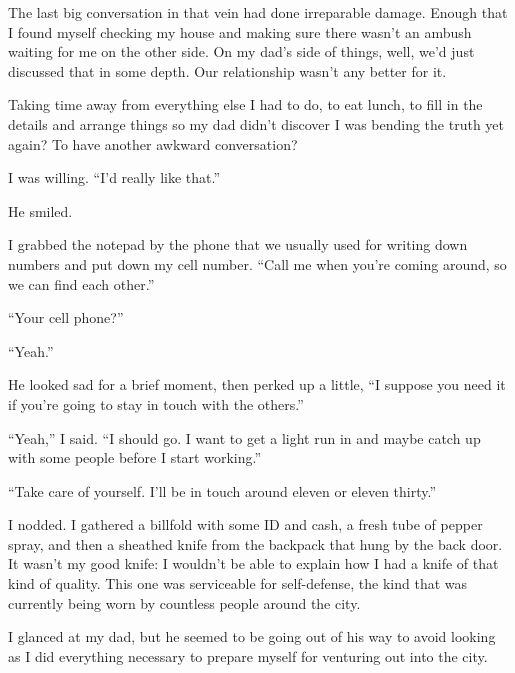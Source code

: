 The last big conversation in that vein had done irreparable damage.  Enough that I found myself checking my house and making sure there wasn't an ambush waiting for me on the other side.  On my dad's side of things, well, we'd just discussed that in some depth.  Our relationship wasn't any better for it.



Taking time away from everything else I had to do, to eat lunch, to fill in the details and arrange things so my dad didn't discover I was bending the truth yet again?  To have another awkward conversation?



I was willing.  ``I'd really like that.''



He smiled.



I grabbed the notepad by the phone that we usually used for writing down numbers and put down my cell number.  ``Call me when you're coming around, so we can find each other.''



``Your cell phone?''



``Yeah.''



He looked sad for a brief moment, then perked up a little, ``I suppose you need it if you're going to stay in touch with the others.''



``Yeah,'' I said.  ``I should go.  I want to get a light run in and maybe catch up with some people before I start working.''



``Take care of yourself.  I'll be in touch around eleven or eleven thirty.''



I nodded.  I gathered a billfold with some ID and cash, a fresh tube of pepper spray, and then a sheathed knife from the backpack that hung by the back door.  It wasn't my good knife: I wouldn't be able to explain how I had a knife of that kind of quality.  This one was serviceable for self-defense, the kind that was currently being worn by countless people around the city.



I glanced at my dad, but he seemed to be going out of his way to avoid looking as I did everything necessary to prepare myself for venturing out into the city.




